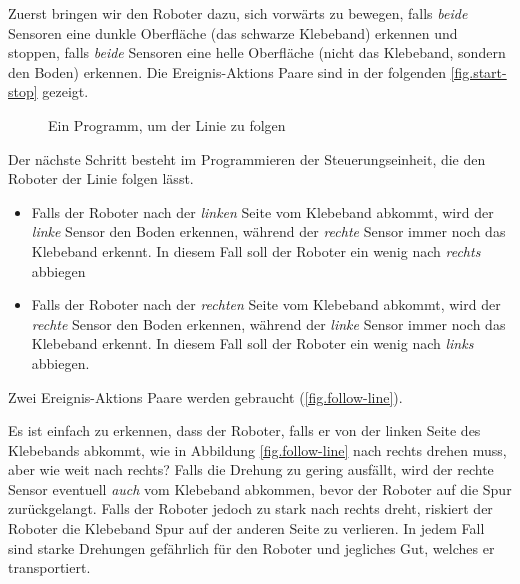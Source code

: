 Zuerst bringen wir den Roboter dazu,  sich vorwärts zu bewegen,
falls \emph{beide} Sensoren eine dunkle Oberfläche (das schwarze Klebeband) erkennen 
und stoppen, falls \emph{beide} Sensoren eine helle Oberfläche (nicht das Klebeband, sondern den Boden) erkennen.
Die Ereignis-Aktions Paare sind in der folgenden \cref{fig.start-stop} gezeigt.


\begin{figure}
	\hfill
	\caption{Ein Programm, um der Linie zu folgen}
\end{figure}


Der nächste Schritt besteht im Programmieren der Steuerungseinheit,
die den Roboter der Linie folgen lässt.

\begin{itemize}

\item Falls der Roboter nach der \emph{linken} Seite vom Klebeband abkommt,
wird der \emph{linke} Sensor den Boden erkennen,
während der \emph{rechte} Sensor immer noch das Klebeband erkennt.
In diesem Fall soll der Roboter ein wenig nach \emph{rechts} abbiegen

\item Falls der Roboter nach der \emph{rechten} Seite vom Klebeband abkommt,
wird der \emph{rechte} Sensor den Boden erkennen,
während der \emph{linke} Sensor immer noch das Klebeband erkennt.
In diesem Fall soll der Roboter ein wenig nach \emph{links} abbiegen.
\end{itemize}

Zwei Ereignis-Aktions Paare werden gebraucht  (\cref{fig.follow-line}).


Es ist einfach zu erkennen,
dass der Roboter, falls er von der linken Seite des Klebebands abkommt,
wie in Abbildung \cref{fig.follow-line} nach rechts drehen muss,
aber wie weit nach rechts? Falls die Drehung zu gering ausfällt,
wird der rechte Sensor eventuell \emph{auch} vom Klebeband abkommen,
bevor der Roboter auf die Spur zurückgelangt.
Falls der Roboter jedoch zu stark nach rechts dreht,
riskiert der Roboter die Klebeband Spur auf der anderen Seite zu verlieren.
In jedem Fall sind starke Drehungen gefährlich für den Roboter und jegliches Gut,
welches er transportiert.

